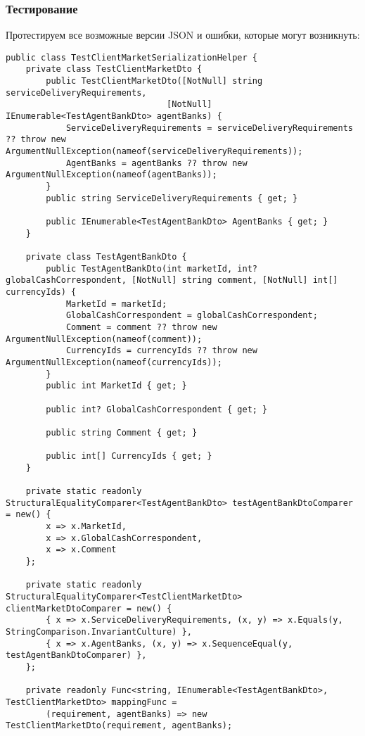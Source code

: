 \documentclass[a4paper,14pt]{extarticle}
\begin{document}
\subsubsection{Тестирование}
Протестируем все возможные версии JSON и ошибки, которые могут возникнуть:
\begin{lstlisting}
public class TestClientMarketSerializationHelper {
    private class TestClientMarketDto {
        public TestClientMarketDto([NotNull] string serviceDeliveryRequirements,
                                [NotNull] IEnumerable<TestAgentBankDto> agentBanks) {
            ServiceDeliveryRequirements = serviceDeliveryRequirements ?? throw new ArgumentNullException(nameof(serviceDeliveryRequirements));
            AgentBanks = agentBanks ?? throw new ArgumentNullException(nameof(agentBanks));
        }
        public string ServiceDeliveryRequirements { get; }

        public IEnumerable<TestAgentBankDto> AgentBanks { get; }
    }

    private class TestAgentBankDto {
        public TestAgentBankDto(int marketId, int? globalCashCorrespondent, [NotNull] string comment, [NotNull] int[] currencyIds) {
            MarketId = marketId;
            GlobalCashCorrespondent = globalCashCorrespondent;
            Comment = comment ?? throw new ArgumentNullException(nameof(comment));
            CurrencyIds = currencyIds ?? throw new ArgumentNullException(nameof(currencyIds));
        }
        public int MarketId { get; }

        public int? GlobalCashCorrespondent { get; }

        public string Comment { get; }

        public int[] CurrencyIds { get; }
    }

    private static readonly StructuralEqualityComparer<TestAgentBankDto> testAgentBankDtoComparer = new() {
        x => x.MarketId,
        x => x.GlobalCashCorrespondent,
        x => x.Comment
    };

    private static readonly StructuralEqualityComparer<TestClientMarketDto> clientMarketDtoComparer = new() {
        { x => x.ServiceDeliveryRequirements, (x, y) => x.Equals(y, StringComparison.InvariantCulture) },
        { x => x.AgentBanks, (x, y) => x.SequenceEqual(y, testAgentBankDtoComparer) },
    };

    private readonly Func<string, IEnumerable<TestAgentBankDto>, TestClientMarketDto> mappingFunc =
        (requirement, agentBanks) => new TestClientMarketDto(requirement, agentBanks);


\end{lstlisting}
\end{document}
